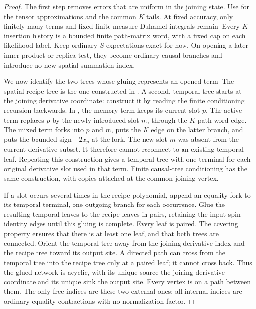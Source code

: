 \begin{proof}
The first step removes errors that are uniform in the joining state.
Use  for the tensor
approximations and the common $K$ tails.  At fixed accuracy, only
finitely many terms and fixed finite-measure Duhamel integrals remain.
Every $K$ insertion history is a bounded finite path-matrix word,
with a fixed cap on each likelihood label.  Keep ordinary $S$
expectations exact for now.  On opening a later inner-product or
replica test, they become ordinary causal branches and introduce no
new spatial summation index.

We now identify the two trees whose gluing represents an opened term.
The spatial recipe tree is the one constructed in
.  A second, temporal tree
starts at the joining derivative coordinate: construct it by reading
the finite conditioning recursion backwards.  In
, the memory term keeps its current
slot $p$.  The active term replaces $p$ by the newly introduced
slot $m$, through the $K$ path-word edge.  The mixed term forks
into $p$ and $m$, puts the $K$ edge on the latter branch, and
puts the bounded sign $-2x_p$ at the fork.  The new slot $m$ was
absent from the current derivative subset.  It therefore cannot
reconnect to an existing temporal leaf.  Repeating this construction
gives a temporal tree with one terminal for each original derivative
slot used in that term.  Finite causal-tree conditioning has the same
construction, with copies attached at the common joining vertex.

If a slot occurs several times in the recipe polynomial, append an
equality fork to its temporal terminal, one outgoing branch for each
occurrence.  Glue the resulting temporal leaves to the recipe leaves
in pairs, retaining the input-spin identity edges until this gluing
is complete.  Every leaf is paired.  The covering property ensures
that there is at least one leaf, and that both trees are connected.
Orient the temporal tree away from the joining derivative index and
the recipe tree toward its output site.  A directed path can cross
from the temporal tree into the recipe tree only at a paired leaf;
it cannot cross back.  Thus the glued network is acyclic, with its
unique source the joining derivative coordinate and its unique sink
the output site.  Every vertex is on a path between them.  The only
free indices are these two external ones; all internal indices are
ordinary equality contractions with no normalization factor.


\end{proof}
